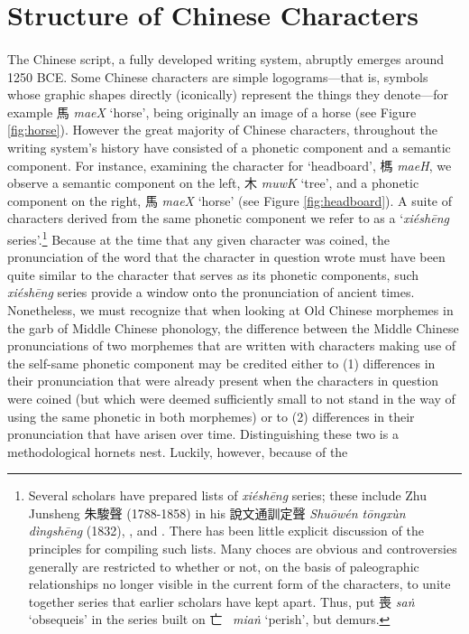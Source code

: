 \section{Structure of Chinese Characters}

\paragraph{}
The Chinese script, a fully developed writing system, abruptly emerges around 1250 BCE. 
Some Chinese characters are simple logograms---that is, symbols whose graphic shapes directly (iconically) represent the things they denote---for example 馬 \textit{maeX} `horse', being originally an image of a horse (see Figure \ref{fig:horse}). 
However the great majority of Chinese characters, throughout the writing system's history have consisted of a phonetic component and a semantic component. For instance, examining the character for `headboard', 榪 \textit{maeH}, we observe a semantic component on the left, 木 \textit{muwK} `tree', and a phonetic component on the right, 馬 \textit{maeX} `horse'
 (see Figure \ref{fig:headboard}). 
A suite of characters derived from the same phonetic component we refer to as a `\textit{xiéshēng} series'.\footnote{
Several scholars have prepared lists of \textit{xiéshēng} series; these include Zhu Junsheng 朱駿聲
(1788-1858) in his 說文通訓定聲
 \emph{Shuōwén tōngxùn dìngshēng} (1832), \citet[]{Karlgren1957}, and \citet[]{Schuessler2009minimal}. There has been little explicit discussion of the principles for compiling such lists. Many choces are obvious and controversies generally are restricted to whether or not, on the basis of paleographic relationships no longer visible in the current form of the characters, to unite together series that earlier scholars have kept apart. Thus, 
\citet[143]{Baxter2014OldChinese}
put 喪  \emph{saṅ} `obsequeis'
in the series built on 亡~ \emph{miaṅ} `perish', 
but 
\citet[87]{Schuessler2009minimal}
demurs.} Because at the time that any given character was coined, the pronunciation of the word that the character in question wrote must have been quite similar to the character that serves as its phonetic components, such \textit{xiéshēng} series provide a window onto the pronunciation of ancient times. Nonetheless, we must recognize that when looking at Old Chinese morphemes in the garb of Middle Chinese phonology, the difference between the Middle Chinese pronunciations of two morphemes that are written with characters making use of the self-same phonetic component may be credited either to (1) differences in their pronunciation that were already present when the characters in question were coined (but which were deemed sufficiently small to not stand in the way of using the same phonetic in both morphemes) or to (2) differences in their pronunciation that have arisen over time. Distinguishing these two is a methodological hornets nest. Luckily, however, because of the

